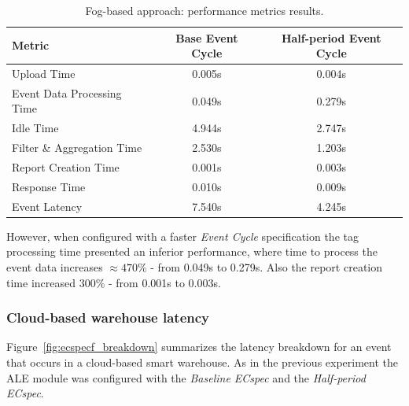 \begin{table}[ht!]
  \centering
    \begin{tabular}{|l|c|c|}
    \hline
    Metric                            & Base Event Cycle & Half-period Event Cycle \\ \hline
    Upload Time                       & 0.005s           & 0.004s                  \\ \hline
    Event Data Processing Time        & 0.049s           & 0.279s                  \\ \hline
    Idle Time                         & 4.944s           & 2.747s                  \\ \hline
    Filter \& Aggregation Time        & 2.530s           & 1.203s                  \\ \hline
    Report Creation Time              & 0.001s           & 0.003s                  \\ \hline
    Response Time                     & 0.010s           & 0.009s                  \\ \hline
    Event Latency                     & 7.540s           & 4.245s                  \\ \hline
    \end{tabular}
  \caption[Fog-based approach: performance results.]{Fog-based approach: performance metrics results.}
  \label{table:fog_metrics}
\end{table}

However, when configured with a faster \textit{Event Cycle} specification the tag processing time
presented an inferior performance, where time to process the event data increases $\approx470\%$
- from 0.049s to 0.279s. Also the report creation time increased $300\%$ - from 0.001s to 0.003s.\\

\subsubsection{Cloud-based warehouse latency}
\label{subs:eval_exp_latency_ecspec_fast}
Figure~\ref{fig:ecspecf_breakdown} summarizes the latency breakdown for an event that occurs in a cloud-based
smart warehouse. As in the previous experiment the \gls{ALE} module was configured with the
\textit{Baseline ECspec} and the \textit{Half-period ECspec}.\\

